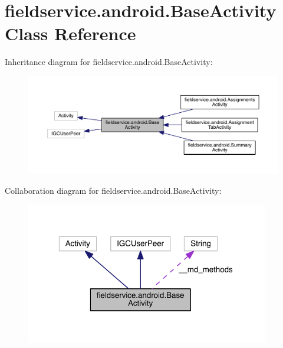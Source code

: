 \hypertarget{classfieldservice_1_1android_1_1_base_activity}{\section{fieldservice.\+android.\+Base\+Activity Class Reference}
\label{classfieldservice_1_1android_1_1_base_activity}
}


Inheritance diagram for fieldservice.\+android.\+Base\+Activity\+:
\nopagebreak
\begin{figure}[H]
\begin{center}
\leavevmode
\includegraphics[width=350pt]{classfieldservice_1_1android_1_1_base_activity__inherit__graph}
\end{center}
\end{figure}


Collaboration diagram for fieldservice.\+android.\+Base\+Activity\+:
\nopagebreak
\begin{figure}[H]
\begin{center}
\leavevmode
\includegraphics[width=301pt]{classfieldservice_1_1android_1_1_base_activity__coll__graph}
\end{center}
\end{figure}
